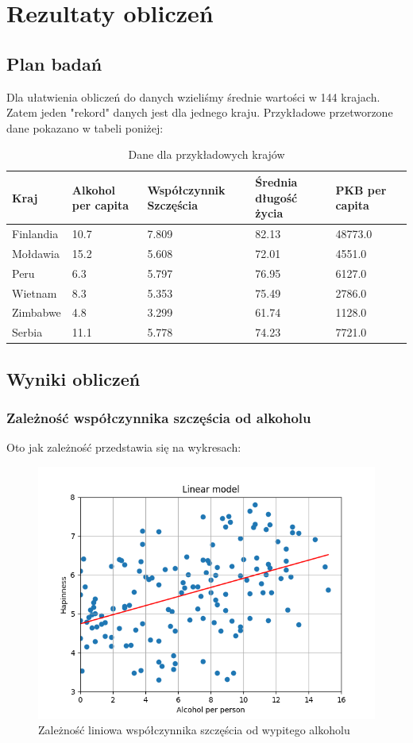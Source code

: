 \documentclass[10pt]{article}
\begin{document}
\section{Rezultaty obliczeń}

\subsection{Plan badań}
Dla ułatwienia obliczeń do danych wzieliśmy średnie wartości w 144 krajach.
Zatem jeden "rekord" danych jest dla jednego kraju.
Przykładowe przetworzone dane pokazano w tabeli poniżej:

\begin{table}[H]
    \begin{tabular}{|l|l|l|l|l|l|}
    \hline
    \textbf{Kraj}  & \textbf{Alkohol per capita} & \textbf{Współczynnik Szczęścia} & \textbf{Średnia długość życia} & \textbf{PKB per capita} \\ \hline
    Finlandia & 10.7 & 7.809 & 82.13 & 48773.0   \\ \hline
    Mołdawia & 15.2 & 5.608 & 72.01 & 4551.0   \\ \hline
    Peru & 6.3 & 5.797 & 76.95 & 6127.0   \\ \hline
    Wietnam & 8.3 & 5.353 & 75.49 & 2786.0   \\ \hline
    Zimbabwe & 4.8 & 3.299 & 61.74 & 1128.0  \\ \hline
    Serbia & 11.1 & 5.778 & 74.23 & 7721.0   \\ \hline
    \end{tabular}
    \caption{Dane dla przykładowych krajów}
\end{table}

\subsection{Wyniki obliczeń}
\subsubsection{Zależność współczynnika szczęścia od alkoholu}
Oto jak zależność przedstawia się na wykresach:
\begin{figure}[H]
    \begin{center}
        \includegraphics[width=0.8\linewidth]{plots/happiness_dependence_linear.png}
        \caption{Zależność liniowa współczynnika szczęścia od wypitego alkoholu}
    \end{center}
\end{figure}
\end{document}
